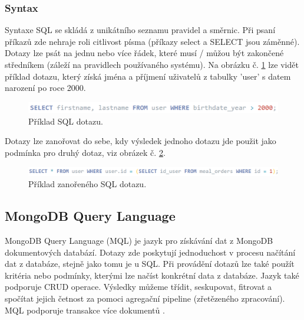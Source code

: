 \subsubsection{Syntax}
Syntaxe \gls{SQL} se skládá z unikátního seznamu pravidel a směrnic. Při psaní příkazů zde nehraje roli citlivost písma (příkazy select a SELECT jsou záměnné). Dotazy lze psát na jednu nebo více řádek, které musí / můžou být zakončené středníkem (záleží na pravidlech používaného systému). Na obrázku č. \ref{fig:sql} lze vidět příklad dotazu, který získá jména a příjmení uživatelů z tabulky 'user' s datem narození po roce 2000.
	\begin{figure}[H]
	\centering
	\includegraphics[width=13cm]{img/databaze/sql}
	\caption{Příklad \gls{SQL} dotazu.}
	\label{fig:sql}
	\end{figure}

\noindent Dotazy lze zanořovat do sebe, kdy výsledek jednoho dotazu jde použit jako podmínka pro druhý dotaz, viz obrázek č. \ref{fig:sql2}.
	\begin{figure}[H]
	\centering
	\includegraphics[width=14cm]{img/databaze/sql2}
	\caption{Příklad zanořeného \gls{SQL} dotazu.}
	\label{fig:sql2}
	\end{figure}

\subsection{MongoDB Query Language}
MongoDB Query Language (\gls{MQL}) je jazyk pro získávání dat z MongoDB dokumentových databází. Dotazy zde poskytují jednoduchost v procesu načítání dat z databáze, stejně jako tomu je u \gls{SQL}. Při provádění dotazů lze také použít kritéria nebo podmínky, kterými lze načíst konkrétní data z databáze. Jazyk také podporuje \gls{CRUD} operace. Výsledky můžeme třídit, seskupovat, fitrovat a spočítat jejich četnost za pomoci agregační pipeline (zřetězeného zpracování). \gls{MQL} podporuje transakce více dokumentů \cite{mongo_lang}.

